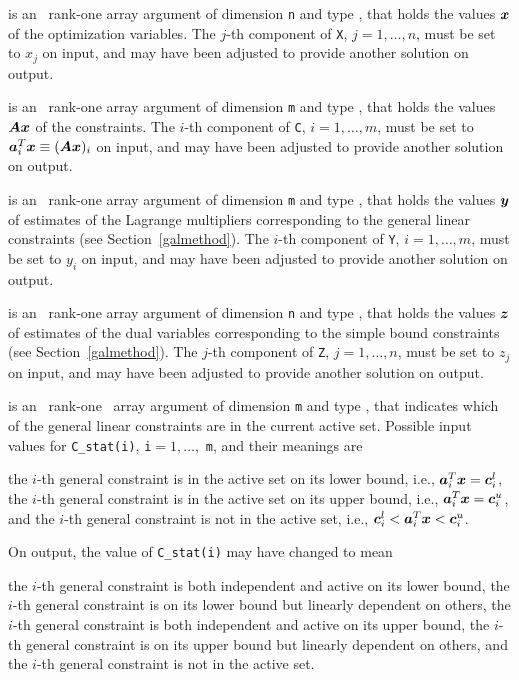 \documentclass{galahad}
\begin{document}
\begin{description}
 is an \intentinout\ rank-one array argument of dimension {\tt n}
and type \realdp,
that holds the values ${\bm{x}}$ of the optimization variables.
The $j$-th component of {\tt X}, $j = 1,  \ldots , n$, must be set to $x_{j}$
on input, and may have been adjusted to provide another solution on output.

 is an \intentinout\ rank-one array argument of dimension {\tt m}
and type \realdp, that holds
the values ${\bm{A}} {\bm{x}}$ of the constraints.
The $i$-th component of {\tt C}, $i = 1,  \ldots ,  m$, must be set to
${\bm{a}}_{i}^{T}{\bm{x}} \equiv ({\bm{A}} {\bm{x}})_{i}$
on input, and may have been adjusted to provide another solution on output.

 is an \intentinout\ rank-one array argument of dimension {\tt m}
and type \realdp, that holds
the values ${\bm{y}}$ of estimates  of the Lagrange multipliers
corresponding to the general linear constraints (see Section~\ref{galmethod}).
The $i$-th component of {\tt Y}, $i = 1,  \ldots ,  m$, must be set to $y_{i}$
on input, and may have been adjusted to provide another solution on output.

 is an \intentinout\ rank-one array argument of dimension {\tt n}
and type \realdp, that holds
the values ${\bm{z}}$ of estimates  of the dual variables
corresponding to the simple bound constraints (see Section~\ref{galmethod}).
The $j$-th component of {\tt Z}, $j = 1,  \ldots ,  n$, must be set to $z_{j}$
on input, and may have been adjusted to provide another solution on output.

 is an \intentin\ rank-one \intentinout\ array argument of
dimension {\tt m}
and type \integer, that indicates which of the general linear
constraints are in the current active set. Possible input values for
{\tt C\_stat(i)}, {\tt i}$=1, \ldots ,$ {\tt m}, and their meanings are
\begin{description}
 the $i$-th general constraint
is in the active set on its lower bound, i.e., ${\bm{a}}_i^T {\bm{x}} = {\bm{c}}_i^{l}$,
 the $i$-th general constraint
is in the active set on its upper bound, i.e., ${\bm{a}}_i^T {\bm{x}} = {\bm{c}}_i^{u}$,
and
  the $i$-th general constraint is not in the active set,
i.e., ${\bm{c}}_i^{l} < {\bm{a}}_i^T {\bm{x}} < {\bm{c}}_i^{u}$.
\end{description}
On output, the value of {\tt C\_stat(i)} may have changed to mean
\begin{description}
 the $i$-th general constraint
is both independent and active on its lower bound,
 the $i$-th general constraint
is on its lower bound but linearly dependent on others,
 the $i$-th general constraint
is both independent and active on its upper bound,
 the $i$-th general constraint
is on its upper bound but linearly dependent on others, and
 the $i$-th general constraint is not in the active set.
\end{description}



\end{description}
\end{document}

